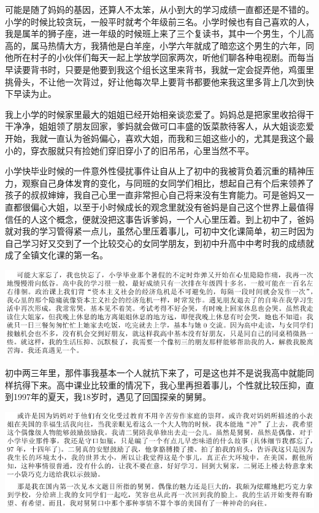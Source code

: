 \documentclass[9pt, b5paper]{article}
\begin{document}
可能是随了妈妈的基因，还算人不太笨，从小到大的学习成绩一直都还是不错的。小学的时候比较贪玩，一般平时就考个年级前三名。小学时候也有自己喜欢的人，我是属羊的狮子座，进一年级的时候班上来了三个复读书，其中一个男生，个儿高高的，属马热情大方，我猜他是白羊座，小学六年就成了暗恋这个男生的六年，同他所在村子的小伙伴们每天一起上学放学回家两次，听他们聊各种电视剧。而每当早读要背书时，只要是他要到我这个组长这里来背书，我就一定会捉弄他，鸡蛋里挑骨头，不让他一次背过，好让他每次早上要背书都要他来我这里多背上几次到快下早读为止。

我上小学的时候家里最大的姐姐已经开始相亲谈恋爱了。妈妈总是把家里收拾得干干净净，姐姐领了朋友回家，爹妈就会做可口丰盛的饭菜款待客人，从大姐谈恋爱开始，我就一直认为爸妈偏心，喜欢大姐，而我和三姐这些小的，尤其是我这个最小的，穿衣服就只有捡她们穿旧穿小了的旧吊吊，心里当然不平。

小学快毕业时候的一件意外性侵扰事件让自从上了初中的我被背负着沉重的精神压力，观察自己身体发育的变化，与同班的女同学们相比，想起自己有个后来领养了孩子的叔叔婶婶，我自己心里一直非常担心自己将来没有生育能力。可是爸妈又一直都很偏心大姐，以至于小时候成长的观念里就没有爸妈是自己这个世界上最值得信任的人这个概念，便就没把这事告诉爹妈，一个人心里压着。到上初中了，爸妈就对我的学习管得紧一点儿，虽然心里压着事儿，可初中文化课简单，初三时因为自己学习好又交到了一个比较交心的女同学朋友，到初中升高中中考时我的成绩就成了全镇文化课的第一名。

\begin{center}
\includegraphics[width=.9\linewidth]{./pic/p1p21-0.png}
\end{center}

初中两三年里，那件事我基本一个人就抗下来了，可是这也并不是说我高中就能同样抗得下来。高中课业比较重的情况下，我心里再担着事儿，个性就比较压抑，直到1997年的夏天，我18岁时，遇见了回国探亲的舅舅。

\begin{center}
\includegraphics[width=.9\linewidth]{./pic/p1p21.png}
\end{center}
\end{document}
